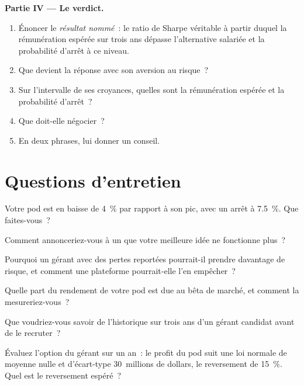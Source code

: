 \begin{problem}
\medskip\noindent\textbf{Partie IV --- Le verdict.}
\begin{enumerate}[resume]
\item Énoncer le \emph{résultat nommé}~: le ratio de Sharpe véritable à partir duquel la rémunération espérée sur trois ans dépasse l'alternative salariée
et la probabilité d'arrêt à ce niveau.
\item Que devient la réponse avec son aversion au risque~?
\item Sur l'intervalle de ses croyances, quelles sont la rémunération espérée et la probabilité d'arrêt~?
\item Que doit-elle négocier~?
\item En deux phrases, lui donner un conseil.
\end{enumerate}
\end{problem}

\section{Questions d'entretien}

\begin{interviewq}\label{iq:in:portfolio-manager-and-pod-analyst:1}
Votre pod est en baisse de 4~\% par rapport à son pic, avec un arrêt à 7.5~\%. Que faites-vous~?
\end{interviewq}

\begin{interviewq}\label{iq:in:portfolio-manager-and-pod-analyst:2}
Comment annonceriez-vous à un  que votre meilleure idée ne fonctionne plus~?
\end{interviewq}

\begin{interviewq}\label{iq:in:portfolio-manager-and-pod-analyst:3}
Pourquoi un gérant avec des pertes reportées pourrait-il prendre davantage de risque, et comment une plateforme pourrait-elle l'en empêcher~?
\end{interviewq}

\begin{interviewq}\label{iq:in:portfolio-manager-and-pod-analyst:4}
Quelle part du rendement de votre pod est due au bêta de marché, et comment la mesureriez-vous~?
\end{interviewq}

\begin{interviewq}\label{iq:in:portfolio-manager-and-pod-analyst:5}
Que voudriez-vous savoir de l'historique sur trois ans d'un gérant candidat avant de le recruter~?
\end{interviewq}

\begin{interviewq}\label{iq:in:portfolio-manager-and-pod-analyst:6}
Évaluez l'option du gérant sur un an~: le profit du pod suit une loi normale de moyenne nulle et d'écart-type 30~millions de dollars, le
reversement de 15~\%. Quel est le reversement espéré~?
\end{interviewq}
